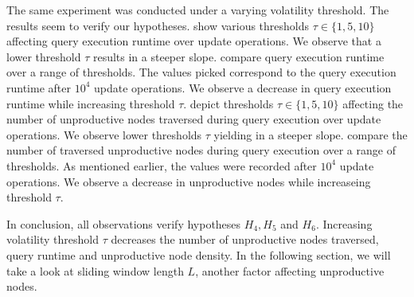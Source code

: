 \documentclass[abstracton,12pt]{scrartcl}
\theoremstyle{definition}
\begin{document}
The same experiment was conducted under a varying volatility threshold. The
results seem to verify our hypotheses.
 show
various thresholds $\tau \in \{1,5,10\}$ affecting query execution runtime
over update operations. We observe that a lower threshold $\tau$ results in a
steeper slope.
 compare query
execution runtime over a range of thresholds. The values picked correspond to
the query execution runtime after $10^4$ update operations.
We observe a decrease in query execution runtime while increasing threshold $\tau$.
depict thresholds $\tau \in \{1,5,10\}$ affecting the number of unproductive
nodes traversed during query execution over update operations. We observe lower
thresholds $\tau$ yielding in a steeper slope.
 compare the
number of traversed unproductive nodes during query execution over a range of
thresholds. As mentioned earlier, the values were recorded after $10^4$ update
operations. We observe a decrease in unproductive nodes while increaseing
threshold $\tau.$

In conclusion, all observations verify hypotheses $H_4, H_5$ and $H_6$.
Increasing volatility threshold $\tau$ decreases the number of unproductive
nodes traversed, query runtime and unproductive node density. In the following
section, we will take a look at sliding window length $L$, another factor
affecting unproductive nodes.
\end{document}
